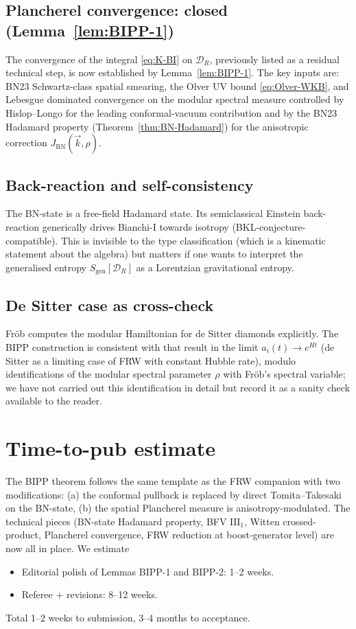 \documentclass[11pt,a4paper]{article}
\theoremstyle{definition}
\newcommand{\cD}{\mathcal{D}}
\newcommand{\BN}{\mathrm{BN}}
\begin{document}
\subsection{Plancherel convergence: closed (Lemma~\ref{lem:BIPP-1})}
The convergence of the integral \eqref{eq:K-BI} on $\cD_R$, previously
listed as a residual technical step, is now established by
Lemma~\ref{lem:BIPP-1}. The key inputs are: BN23 Schwartz-class
spatial smearing, the Olver UV bound \eqref{eq:Olver-WKB}, and Lebesgue
dominated convergence on the modular spectral measure controlled by
Hislop--Longo \cite{HislopLongo82} for the leading conformal-vacuum
contribution and by the BN23 Hadamard property
(Theorem~\ref{thm:BN-Hadamard}) for the anisotropic correction
$J_\BN(\vec k,\rho)$.

\subsection{Back-reaction and self-consistency}
The BN-state is a free-field Hadamard state. Its semiclassical Einstein
back-reaction generically drives Bianchi-I towards isotropy
(BKL-conjecture-compatible). This is invisible to the type
classification (which is a kinematic statement about the algebra) but
matters if one wants to interpret the generalised entropy
$S_\mathrm{gen}[\cD_R]$ as a Lorentzian gravitational entropy.

\subsection{De Sitter case as cross-check}
Fr\"ob \cite{Frob2023} computes the modular Hamiltonian for de Sitter
diamonds explicitly. The BIPP construction is consistent with that
result in the limit $a_i(t)\to e^{Ht}$ (de Sitter as a limiting case
of FRW with constant Hubble rate), modulo identifications of the
modular spectral parameter $\rho$ with Fr\"ob's spectral variable; we
have not carried out this identification in detail but record it as a
sanity check available to the reader.

\section{Time-to-pub estimate}

The BIPP theorem follows the same template as the FRW companion
\cite{ECI-FRW-note} with two modifications: (a) the conformal pullback
is replaced by direct Tomita--Takesaki on the BN-state, (b) the spatial
Plancherel measure is anisotropy-modulated. The technical pieces
(BN-state Hadamard property, BFV $\mathrm{III}_1$, Witten crossed-product,
Plancherel convergence, FRW reduction at boost-generator level) are now
all in place. We estimate
\begin{itemize}\setlength\itemsep{2pt}
\item Editorial polish of Lemmas BIPP-1 and BIPP-2: 1--2 weeks.
\item Referee + revisions: 8--12 weeks.
\end{itemize}
Total 1--2 weeks to submission, 3--4 months to acceptance.
\end{document}
